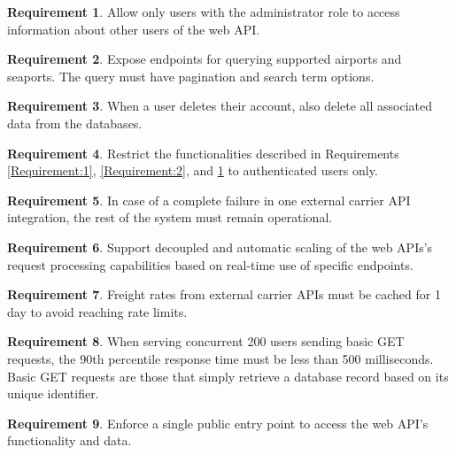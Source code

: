 \documentclass[12pt, reqno]{amsbook}
\theoremstyle{definition}
\theoremstyle{definition}
\newtheorem{requirement}{Requirement}
\numberwithin{section}{chapter}
\numberwithin{table}{chapter}
\numberwithin{figure}{chapter}
\begin{document}
\begin{requirement}
  \label{Requirement:3}
  Allow only users with the administrator role to access information about other users of the web \ac{API}.
\end{requirement}

\begin{requirement}
  \label{Requirement:4}
  Expose endpoints for querying supported airports and seaports. The query must have pagination and search term options.
\end{requirement}

\begin{requirement}
  \label{Requirement:5}
  When a user deletes their account, also delete all associated data from the databases.
\end{requirement}

\begin{requirement}
  \label{Requirement:6}
  Restrict the functionalities described in Requirements \ref{Requirement:1}, \ref{Requirement:2}, and \ref{Requirement:3} to authenticated users only.
\end{requirement}

\begin{requirement}
  \label{Requirement:7}
  In case of a complete failure in one external carrier \ac{API} integration, the rest of the system must remain operational.
\end{requirement}

\begin{requirement}
  \label{Requirement:8}
  Support decoupled and automatic scaling of the web \acp{API}'s request processing capabilities based on real-time use of specific endpoints.
\end{requirement}

\begin{requirement}
  \label{Requirement:9}
  Freight rates from external carrier \acp{API} must be cached for 1 day to avoid reaching rate limits.
\end{requirement}

\begin{requirement}
  \label{Requirement:10}
  When serving concurrent 200 users sending basic GET requests, the 90th percentile response time must be less than 500 milliseconds. Basic GET requests are those that simply retrieve a database record based on its unique identifier.
\end{requirement}

\begin{requirement}
  \label{Requirement:11}
  Enforce a single public entry point to access the web \ac{API}'s functionality and data.
\end{requirement}
\end{document}
